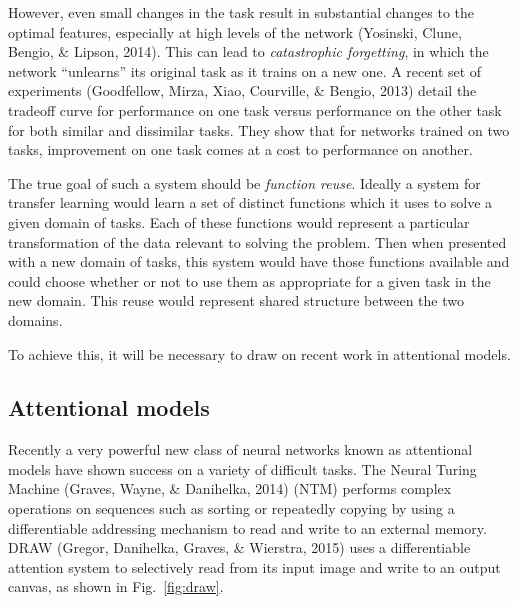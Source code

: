 \documentclass[]{article}
\begin{document}
However, even small changes in the task result in substantial changes to
the optimal features, especially at high levels of the network
(Yosinski, Clune, Bengio, \& Lipson, 2014). This can lead to
\emph{catastrophic forgetting}, in which the network ``unlearns'' its
original task as it trains on a new one. A recent set of experiments
(Goodfellow, Mirza, Xiao, Courville, \& Bengio, 2013) detail the
tradeoff curve for performance on one task versus performance on the
other task for both similar and dissimilar tasks. They show that for
networks trained on two tasks, improvement on one task comes at a cost
to performance on another.

The true goal of such a system should be \emph{function reuse}. Ideally
a system for transfer learning would learn a set of distinct functions
which it uses to solve a given domain of tasks. Each of these functions
would represent a particular transformation of the data relevant to
solving the problem. Then when presented with a new domain of tasks,
this system would have those functions available and could choose
whether or not to use them as appropriate for a given task in the new
domain. This reuse would represent shared structure between the two
domains.

To achieve this, it will be necessary to draw on recent work in
attentional models.

\subsection{Attentional models}\label{attentional-models}

Recently a very powerful new class of neural networks known as
attentional models have shown success on a variety of difficult tasks.
The Neural Turing Machine (Graves, Wayne, \& Danihelka, 2014) (NTM)
performs complex operations on sequences such as sorting or repeatedly
copying by using a differentiable addressing mechanism to read and write
to an external memory. DRAW (Gregor, Danihelka, Graves, \& Wierstra,
2015) uses a differentiable attention system to selectively read from
its input image and write to an output canvas, as shown in
Fig.~\ref{fig:draw}.
\end{document}

